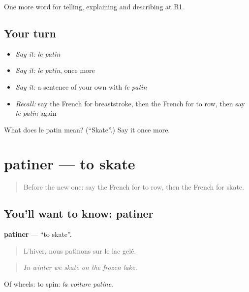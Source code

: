 \begin{grammarlens}[title={What you've built}]
One more word for telling, explaining and describing at B1.
\end{grammarlens}

\subsection*{Your turn}
\begin{itemize}
\raggedright
  \item \emph{Say it:} \emph{le patin}
  \item \emph{Say it:} \emph{le patin}, once more
  \item \emph{Say it:} a sentence of your own with \emph{le patin}
  \item \emph{Recall:} say the French for breaststroke, then the French for to row, then say \emph{le patin} again
\end{itemize}

\begin{tcolorbox}[breakable,colback=teal!4,colframe=teal!35!black,title={Before you move on}]
What does le patin mean? (\textquotedblleft{}Skate\textquotedblright{}.) Say it once more.
\end{tcolorbox}
\section[patiner]{patiner — to skate}

\label{lesson:FR-C510-patiner}



\begin{quote}
Before the new one: say the French for to row, then the French for skate.
\end{quote}

\subsection*{You'll want to know: patiner}
\textbf{patiner} — \textquotedblleft{}to skate\textquotedblright{}.

\begin{quote}
L'hiver, nous patinons sur le lac gelé.
\end{quote}

\begin{quote}
\emph{In winter we skate on the frozen lake.}
\end{quote}

Of wheels: to spin: \emph{la voiture patine}.

